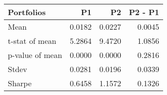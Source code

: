 \begin{tabular}{lrrr}
\toprule
Portfolios & P1 & P2 & P2 - P1 \\
\midrule
Mean & 0.0182 & 0.0227 & 0.0045 \\
t-stat of mean & 5.2864 & 9.4720 & 1.0856 \\
p-value of mean & 0.0000 & 0.0000 & 0.2816 \\
Stdev & 0.0281 & 0.0196 & 0.0339 \\
Sharpe & 0.6458 & 1.1572 & 0.1326 \\
\bottomrule
\end{tabular}
